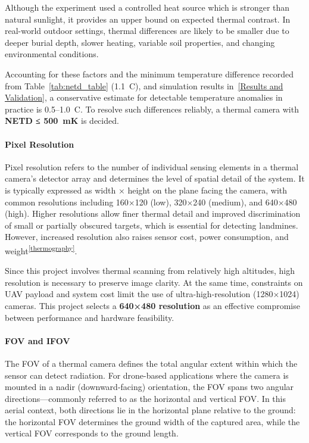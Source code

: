 Although the experiment used a controlled heat source which is stronger than natural sunlight, it provides an upper bound on expected thermal contrast. In real-world outdoor settings, thermal differences are likely to be smaller due to deeper burial depth, slower heating, variable soil properties, and changing environmental conditions.

Accounting for these factors and the minimum temperature difference recorded from Table~\ref{tab:netd_table} (1.1~\textdegree C), and simulation results in~\ref{Results and Validation}, a conservative estimate for detectable temperature anomalies in practice is 0.5–1.0~\textdegree C. To resolve such differences reliably, a thermal camera with \textbf{\gls{NETD} ≤ 500~mK} is decided.


\paragraph{Pixel Resolution}

Pixel resolution refers to the number of individual sensing elements in a thermal camera’s detector array and determines the level of spatial detail of the system. It is typically expressed as width × height on the plane facing the camera, with common resolutions including 160×120 (low), 320×240 (medium), and 640×480 (high). Higher resolutions allow finer thermal detail and improved discrimination of small or partially obscured targets, which is essential for detecting landmines. However, increased resolution also raises sensor cost, power consumption, and weight\textsuperscript{\ref{thermography}}.

Since this project involves thermal scanning from relatively high altitudes, high resolution is necessary to preserve image clarity. At the same time, constraints on \gls{UAV} payload and system cost limit the use of ultra-high-resolution (1280×1024) cameras. This project selects a \textbf{640×480 resolution} as an effective compromise between performance and hardware feasibility.


\paragraph{\gls{FOV} and \gls{IFOV}}

The \gls{FOV} of a thermal camera defines the total angular extent within which the sensor can detect radiation. For drone-based applications where the camera is mounted in a nadir (downward-facing) orientation, the \gls{FOV} spans two angular directions—commonly referred to as the horizontal and vertical \gls{FOV}. In this aerial context, both directions lie in the horizontal plane relative to the ground: the horizontal \gls{FOV} determines the ground width of the captured area, while the vertical FOV corresponds to the ground length.

